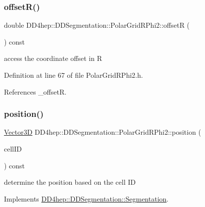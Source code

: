 \subsubsection{\texorpdfstring{offset\+R()}{offsetR()}}
{\footnotesize\ttfamily double D\+D4hep\+::\+D\+D\+Segmentation\+::\+Polar\+Grid\+R\+Phi2\+::offsetR (\begin{DoxyParamCaption}{ }\end{DoxyParamCaption}) const\hspace{0.3cm}{\ttfamily [inline]}}



access the coordinate offset in R 



Definition at line 67 of file Polar\+Grid\+R\+Phi2.\+h.



References \+\_\+offsetR.

\hypertarget{class_d_d4hep_1_1_d_d_segmentation_1_1_polar_grid_r_phi2_a53847924cad4067697490133e8024576}{}\label{class_d_d4hep_1_1_d_d_segmentation_1_1_polar_grid_r_phi2_a53847924cad4067697490133e8024576} 
\subsubsection{\texorpdfstring{position()}{position()}}
{\footnotesize\ttfamily \hyperlink{struct_d_d4hep_1_1_d_d_segmentation_1_1_vector3_d}{Vector3D} D\+D4hep\+::\+D\+D\+Segmentation\+::\+Polar\+Grid\+R\+Phi2\+::position (\begin{DoxyParamCaption}\item[{const \hyperlink{namespace_d_d4hep_1_1_d_d_segmentation_ac7af071d85cb48820914434a07e21ba1}{Cell\+ID} \&}]{cell\+ID }\end{DoxyParamCaption}) const\hspace{0.3cm}{\ttfamily [virtual]}}



determine the position based on the cell ID 



Implements \hyperlink{class_d_d4hep_1_1_d_d_segmentation_1_1_segmentation_a594fe6d78667415855858d083b64acad}{D\+D4hep\+::\+D\+D\+Segmentation\+::\+Segmentation}.



